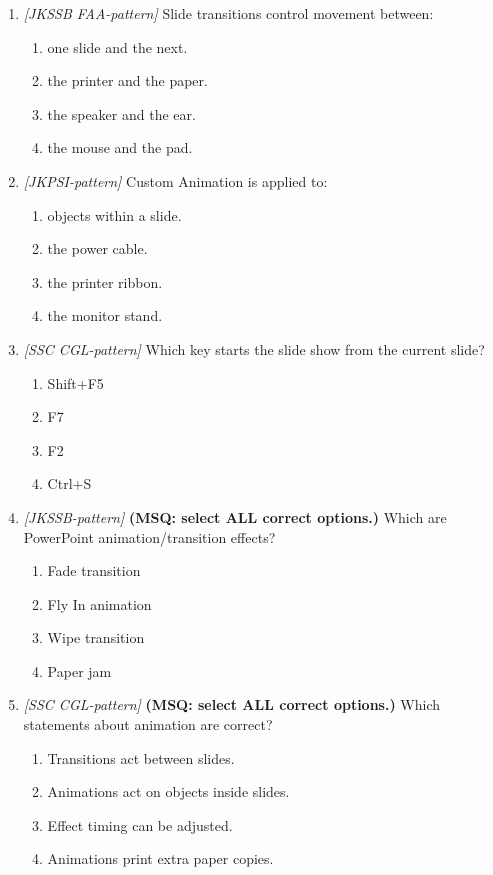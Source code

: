 \documentclass[11pt]{article}
\begin{document}
\begin{enumerate}[label=\textbf{Q\arabic*.}, leftmargin=*]
\item \textit{[JKSSB FAA-pattern]} Slide transitions control movement between:
  \begin{enumerate}[label=\Alph*.]
    \item one slide and the next.
    \item the printer and the paper.
    \item the speaker and the ear.
    \item the mouse and the pad.
  \end{enumerate}
\item \textit{[JKPSI-pattern]} Custom Animation is applied to:
  \begin{enumerate}[label=\Alph*.]
    \item objects within a slide.
    \item the power cable.
    \item the printer ribbon.
    \item the monitor stand.
  \end{enumerate}
\item \textit{[SSC CGL-pattern]} Which key starts the slide show from the current slide?
  \begin{enumerate}[label=\Alph*.]
    \item Shift+F5
    \item F7
    \item F2
    \item Ctrl+S
  \end{enumerate}
\item \textit{[JKSSB-pattern]} \textbf{(MSQ: select ALL correct options.)} Which are PowerPoint animation/transition effects?
  \begin{enumerate}[label=\Alph*.]
    \item Fade transition
    \item Fly In animation
    \item Wipe transition
    \item Paper jam
  \end{enumerate}
\item \textit{[SSC CGL-pattern]} \textbf{(MSQ: select ALL correct options.)} Which statements about animation are correct?
  \begin{enumerate}[label=\Alph*.]
    \item Transitions act between slides.
    \item Animations act on objects inside slides.
    \item Effect timing can be adjusted.
    \item Animations print extra paper copies.
  \end{enumerate}
\end{enumerate}
\def\JKSSBLessonID{32}\def\JKSSBAnswers{0}
\end{document}
